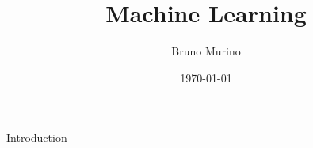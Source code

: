 \documentclass{___mymonograph}
\title{Machine Learning} %
\author{Bruno Murino} %
\date{\today} %
\begin{document}
\frontmatter

\monographtp
\dominitoc
\doparttoc
\pagestyle{onlypagenum}
\tableofcontents
\mainmatter

{Introduction} %



\backmatter
\printbib
\end{document}
